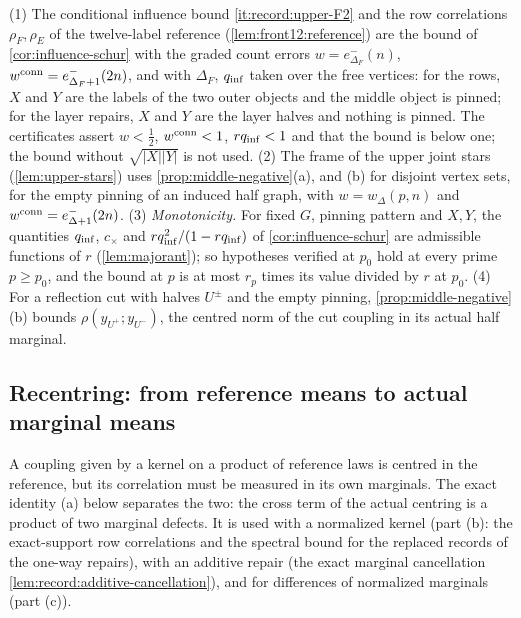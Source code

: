 \begin{remark}\label{rem:influence-uses}
(1) The conditional influence bound \ref{it:record:upper-F2} and the row
correlations $\rho_F,\rho_E$ of the twelve-label reference
(\cref{lem:front12:reference}) are the bound of \cref{cor:influence-schur} with
the graded count errors $w=e^-_{\Delta_F}(n)$, $w^{\rm conn}=e^-_{\Delta_F+1}(2n)$,
and with $\Delta_F$, $q_{\rm inf}$ taken over the free vertices: for the rows,
$X$ and $Y$ are the labels of the two outer objects and the middle object is
pinned; for the layer repairs, $X$ and $Y$ are the layer halves and nothing is
pinned. The certificates assert $w<\frac12$, $w^{\rm conn}<1$, $rq_{\rm inf}<1$
and that the bound is below one; the bound without $\sqrt{|X||Y|}$ is not used.
(2) The frame of the upper joint stars (\cref{lem:upper-stars}) uses
\cref{prop:middle-negative}(a), and (b) for disjoint vertex sets, for the empty
pinning of an induced half graph, with $w=w_\Delta(p,n)$ and
$w^{\rm conn}=e^-_{\Delta+1}(2n)$. (3) \emph{Monotonicity.} For fixed $G$,
pinning pattern and $X,Y$, the quantities $q_{\rm inf}$, $c_\times$ and $rq_{\rm inf}^2/(1-rq_{\rm inf})$ of \cref{cor:influence-schur} are admissible functions of $r$ (\cref{lem:majorant}); so hypotheses verified
at $p_0$ hold at every prime $p\ge p_0$, and the bound at $p$ is at most $r_p$
times its value divided by $r$ at $p_0$. (4) For a reflection cut with halves
$U^\pm$ and the empty pinning, \cref{prop:middle-negative}(b) bounds
$\rho(y_{U^+};y_{U^-})$, the centred norm of the cut coupling in its actual half
marginal.
\end{remark}

\subsection{Recentring: from reference means to actual marginal means}\label{subsec:cuts:recentering}

A coupling given by a kernel on a product of reference laws is centred in the
reference, but its correlation must be measured in its own marginals. The
exact identity (a) below separates the two: the cross term of the actual
centring is a product of two marginal defects. It is used with a normalized
kernel (part (b): the exact-support row correlations and the spectral bound for
the replaced records of the one-way repairs), with an additive repair (the exact
marginal cancellation \cref{lem:record:additive-cancellation}), and for
differences of normalized marginals (part (c)).

